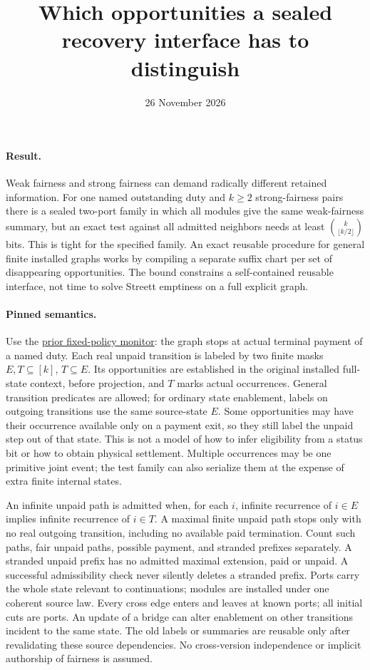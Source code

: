 \documentclass{article}
\title{Which opportunities a sealed recovery interface has to distinguish}
\date{26 November 2026}
\begin{document}
\maketitle
\paragraph{Result.}
Weak fairness and strong fairness can demand radically different retained
information. For one named outstanding duty and \(k\ge2\) strong-fairness
pairs there is a sealed two-port family in which all modules give the same
weak-fairness summary, but an exact test against all admitted neighbors
needs at least \(\binom{k}{\lfloor k/2\rfloor}\) bits. This is tight for the
specified family. An exact reusable procedure for general finite installed
graphs works by compiling a separate suffix chart per set of disappearing
opportunities. The bound constrains a self-contained reusable interface,
not time to solve Streett emptiness on a full explicit graph.

\paragraph{Pinned semantics.}
Use the \href{https://github.com/eternal-november/eos-research-programmes/pull/617}{prior
fixed-policy monitor}: the graph stops at actual terminal payment of a
named duty. Each real unpaid transition is labeled by two finite masks
\(E,T\subseteq[k]\), \(T\subseteq E\). Its opportunities are established
in the original installed full-state context, before projection, and \(T\)
marks actual occurrences. General transition predicates are allowed; for
ordinary state enablement, labels on outgoing transitions use the same
source-state \(E\). Some opportunities may have their occurrence available
only on a payment exit, so they still label the unpaid step out of that
state. This is not a model of how to infer eligibility from a status bit
or how to obtain physical settlement. Multiple occurrences may be one
primitive joint event; the test family can also serialize them at the
expense of extra finite internal states.

An infinite unpaid path is admitted when, for each \(i\), infinite
recurrence of \(i\in E\) implies infinite recurrence of \(i\in T\).
A maximal finite unpaid path stops only with no real outgoing transition,
including no available paid termination. Count such paths, fair unpaid
paths, possible payment, and stranded prefixes separately. A stranded
unpaid prefix has no admitted maximal extension, paid or unpaid.
A successful admissibility check never silently deletes a stranded prefix.
Ports carry the whole state relevant to continuations; modules are
installed under one coherent source law. Every cross edge enters and
leaves at known ports; all initial cuts are ports. An update of a bridge
can alter enablement on other transitions incident to the same state.
The old labels or summaries are reusable only after revalidating these
source dependencies. No cross-version independence or implicit
authorship of fairness is assumed.
\end{document}

